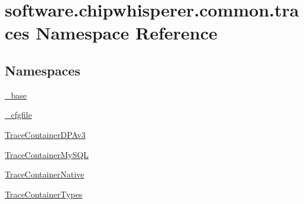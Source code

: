 \hypertarget{namespacesoftware_1_1chipwhisperer_1_1common_1_1traces}{}\section{software.\+chipwhisperer.\+common.\+traces Namespace Reference}
\label{namespacesoftware_1_1chipwhisperer_1_1common_1_1traces}
\subsection*{Namespaces}
\begin{DoxyCompactItemize}
\item 
 \hyperlink{namespacesoftware_1_1chipwhisperer_1_1common_1_1traces_1_1__base}{\+\_\+base}
\item 
 \hyperlink{namespacesoftware_1_1chipwhisperer_1_1common_1_1traces_1_1__cfgfile}{\+\_\+cfgfile}
\item 
 \hyperlink{namespacesoftware_1_1chipwhisperer_1_1common_1_1traces_1_1TraceContainerDPAv3}{Trace\+Container\+D\+P\+Av3}
\item 
 \hyperlink{namespacesoftware_1_1chipwhisperer_1_1common_1_1traces_1_1TraceContainerMySQL}{Trace\+Container\+My\+S\+Q\+L}
\item 
 \hyperlink{namespacesoftware_1_1chipwhisperer_1_1common_1_1traces_1_1TraceContainerNative}{Trace\+Container\+Native}
\item 
 \hyperlink{namespacesoftware_1_1chipwhisperer_1_1common_1_1traces_1_1TraceContainerTypes}{Trace\+Container\+Types}
\end{DoxyCompactItemize}
